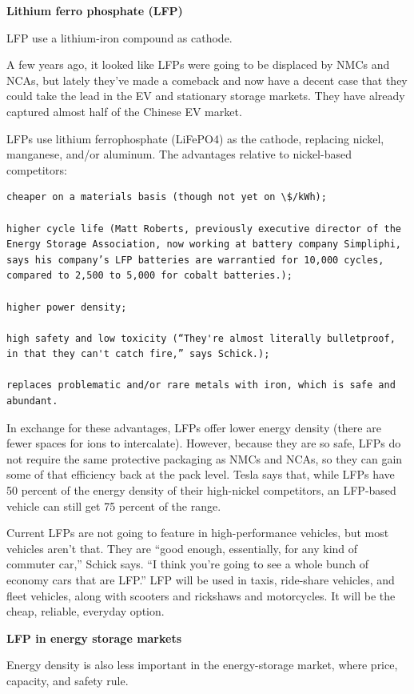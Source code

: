 \documentclass[
]{book}
\begin{document}
\textbf{Lithium ferro phosphate (LFP)}

LFP use a lithium-iron compound as cathode.

A few years ago, it looked like LFPs were going to be displaced by NMCs and NCAs, but lately they've made a comeback and now have a decent case that they could take the lead in the EV and stationary storage markets. They have already captured almost half of the Chinese EV market.

LFPs use lithium ferrophosphate (LiFePO4) as the cathode, replacing nickel, manganese, and/or aluminum. The advantages relative to nickel-based competitors:

\begin{verbatim}
cheaper on a materials basis (though not yet on \$/kWh);

higher cycle life (Matt Roberts, previously executive director of the Energy Storage Association, now working at battery company Simpliphi, says his company’s LFP batteries are warrantied for 10,000 cycles, compared to 2,500 to 5,000 for cobalt batteries.);

higher power density;

high safety and low toxicity (“They're almost literally bulletproof, in that they can't catch fire,” says Schick.);

replaces problematic and/or rare metals with iron, which is safe and abundant.
\end{verbatim}

In exchange for these advantages, LFPs offer lower energy density (there are fewer spaces for ions to intercalate). However, because they are so safe, LFPs do not require the same protective packaging as NMCs and NCAs, so they can gain some of that efficiency back at the pack level. Tesla says that, while LFPs have 50 percent of the energy density of their high-nickel competitors, an LFP-based vehicle can still get 75 percent of the range.

Current LFPs are not going to feature in high-performance vehicles, but most vehicles aren't that. They are ``good enough, essentially, for any kind of commuter car,'' Schick says. ``I think you're going to see a whole bunch of economy cars that are LFP.'' LFP will be used in taxis, ride-share vehicles, and fleet vehicles, along with scooters and rickshaws and motorcycles. It will be the cheap, reliable, everyday option.

\textbf{LFP in energy storage markets}

Energy density is also less important in the energy-storage market, where price, capacity, and safety rule.
\end{document}
